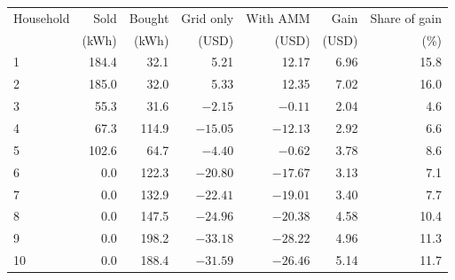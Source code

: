 \begin{tabular}{lrrrrrr}
\toprule
Household & Sold & Bought & Grid only & With AMM & Gain & Share of gain \\
 & (kWh) & (kWh) & (USD) & (USD) & (USD) & (\%) \\
\midrule
1 & 184.4 & 32.1 & 5.21 & 12.17 & 6.96 & 15.8 \\
2 & 185.0 & 32.0 & 5.33 & 12.35 & 7.02 & 16.0 \\
3 & 55.3 & 31.6 & $-2.15$ & $-0.11$ & 2.04 & 4.6 \\
4 & 67.3 & 114.9 & $-15.05$ & $-12.13$ & 2.92 & 6.6 \\
5 & 102.6 & 64.7 & $-4.40$ & $-0.62$ & 3.78 & 8.6 \\
6 & 0.0 & 122.3 & $-20.80$ & $-17.67$ & 3.13 & 7.1 \\
7 & 0.0 & 132.9 & $-22.41$ & $-19.01$ & 3.40 & 7.7 \\
8 & 0.0 & 147.5 & $-24.96$ & $-20.38$ & 4.58 & 10.4 \\
9 & 0.0 & 198.2 & $-33.18$ & $-28.22$ & 4.96 & 11.3 \\
10 & 0.0 & 188.4 & $-31.59$ & $-26.46$ & 5.14 & 11.7 \\
\bottomrule
\end{tabular}